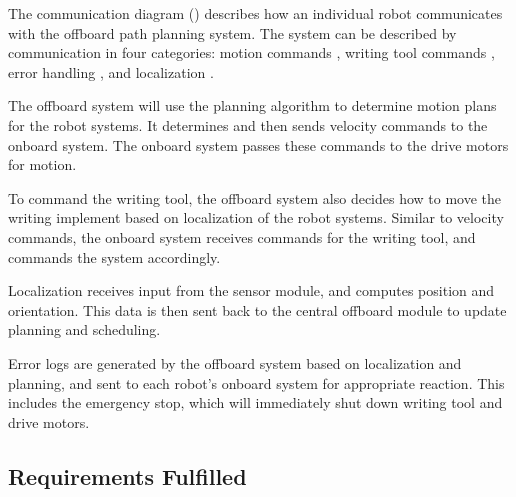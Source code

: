 The communication diagram () describes how an individual robot communicates with the offboard path planning system. The system can be described by communication in four categories: motion commands , writing tool commands , error handling , and localization .

The offboard system will use the planning algorithm to determine motion plans for the robot systems. It determines and then sends velocity commands to the onboard system. The onboard system passes these commands to the drive motors for motion.

To command the writing tool, the offboard system also decides how to move the writing implement based on localization of the robot systems. Similar to velocity commands, the onboard system receives commands for the writing tool, and commands the system accordingly.

Localization receives input from the sensor module, and computes position and orientation. This data is then sent back to the central offboard module to update planning and scheduling.

Error logs are generated by the offboard system based on localization and planning, and sent to each robot's onboard system for appropriate reaction. This includes the emergency stop, which will immediately shut down writing tool and drive motors.

\subsection{Requirements Fulfilled}